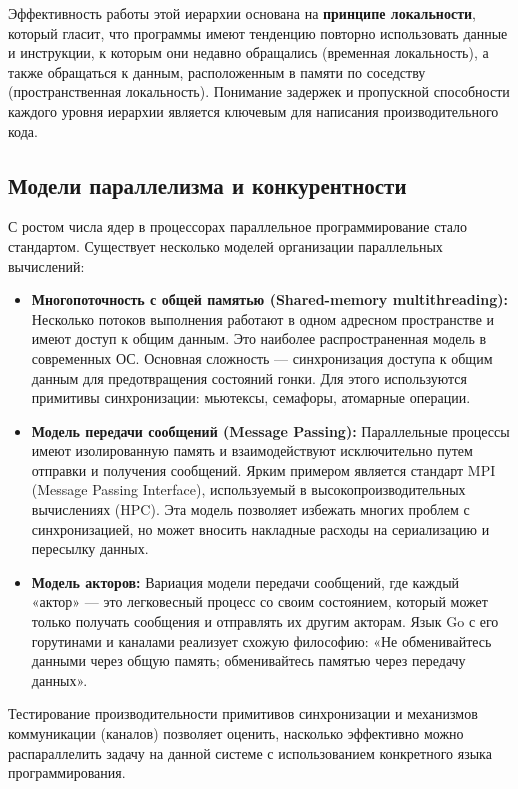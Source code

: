 Эффективность работы этой иерархии основана на \textbf{принципе локальности}, который гласит, что программы имеют тенденцию повторно использовать данные и инструкции, к которым они недавно обращались (временная локальность), а также обращаться к данным, расположенным в памяти по соседству (пространственная локальность). Понимание задержек и пропускной способности каждого уровня иерархии является ключевым для написания производительного кода.

\subsection{Модели параллелизма и конкурентности}

С ростом числа ядер в процессорах параллельное программирование стало стандартом. Существует несколько моделей организации параллельных вычислений:

\begin{itemize}
    \item \textbf{Многопоточность с общей памятью (Shared-memory multithreading):} Несколько потоков выполнения работают в одном адресном пространстве и имеют доступ к общим данным. Это наиболее распространенная модель в современных ОС. Основная сложность — синхронизация доступа к общим данным для предотвращения состояний гонки. Для этого используются примитивы синхронизации: мьютексы, семафоры, атомарные операции.
    \item \textbf{Модель передачи сообщений (Message Passing):} Параллельные процессы имеют изолированную память и взаимодействуют исключительно путем отправки и получения сообщений. Ярким примером является стандарт MPI (Message Passing Interface), используемый в высокопроизводительных вычислениях (HPC). Эта модель позволяет избежать многих проблем с синхронизацией, но может вносить накладные расходы на сериализацию и пересылку данных.
    \item \textbf{Модель акторов:} Вариация модели передачи сообщений, где каждый «актор» — это легковесный процесс со своим состоянием, который может только получать сообщения и отправлять их другим акторам. Язык Go с его горутинами и каналами реализует схожую философию: «Не обменивайтесь данными через общую память; обменивайтесь памятью через передачу данных».
\end{itemize}

Тестирование производительности примитивов синхронизации и механизмов коммуникации (каналов) позволяет оценить, насколько эффективно можно распараллелить задачу на данной системе с использованием конкретного языка программирования.

